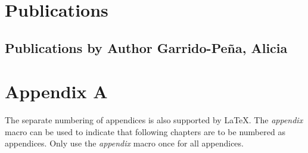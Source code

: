 \documentclass[11pt,a4paper,twoside]{book} %
\numberwithin{equation}{section}
\newcommand{\AuthorName}{Author Garrido-Peña, Alicia}
\begin{document}
\begin{appendix}
\chapter{Publications}


% 

\section{Publications by Author Garrido-Peña, Alicia}
\printbibliography[title={Publications by \AuthorName}, heading=subbibliography]






\chapter{Appendix A}
The separate numbering of appendices is also supported by LaTeX. The \textit{appendix} macro can be used to indicate that following chapters are to be numbered as appendices. Only use the \textit{appendix} macro once for all appendices.


% 


\end{appendix}
\end{document}
